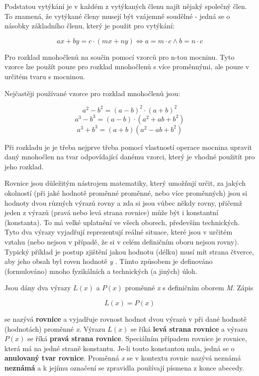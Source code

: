 Podstatou vytýkání je v každém z vytýkaných členu najít nějaký společný člen. To znamená, že vytýkané členy musejí být vzájemně soudělné - jedná se o násobky základního členu, který je použit pro vytýkání:

$$ ax + by = c\cdot (mx + ny) \Leftrightarrow a = m\cdot c \wedge b = n\cdot c $$


Pro rozklad mnohočlenů na součin pomocí vzorců pro n-tou mocninu. Tyto vzorce lze použít pouze pro rozklad mnohočlenů s více proměnnými, ale pouze v určitém tvaru s mocninou.

Nejčastěji používané vzorce pro rozklad mnohočlenů jsou:

$$ a^2 -b^2 = (a-b)^2 \cdot (a+b)^2 $$
$$ a^3 - b^3 = (a-b) \cdot (a^2 + ab +b^2) $$
$$ a^3 + b^3 =(a+b)(a^2-ab+b^2) $$


Při rozkladu je je třeba nejprve třeba pomocí vlastností operace mocnina upravit daný mnohočlen na tvar odpovídající danému vzorci, který je vhodné použitít pro jeho rozklad.




Rovnice jsou důležitým nástrojem matematiky, který umožňují určit, za jakých okolností (při jaké hodnotě proměnné proměnné, nebo více proměnných) jsou si hodnoty dvou různých výrazů rovny a zda si jsou vůbec někdy rovny, přičemž jeden z výrazů (pravá nebo levá strana rovnice) může být i konstantní (konstanta). To má velké uplatnění ve všech oborech, především technických. Tyto dva výrazy vyjadřují reprezentují reálné situace, které jsou v určitém vztahu (nebo nejsou v případě, že si v celém definičním oboru nejsou rovny). Typický příklad je postup zjištění jakou hodnotu (délku) musí mít strana čtverce, aby jeho obsah byl roven hodnotě {\it y} . Tímto způsobem je definováno (formulováno) mnoho fyzikálních a technických (a jiných) úloh. 

Jsou dány dva výrazy $L(x)$ a $P(x)$ proměnné {\it x} s definičním oborem {\it M}. Zápis 

$$ L(x) = P(x) $$

se nazývá {\bf rovnice} a vyjadřuje rovnost hodnot dvou výrazů v při dané hodnotě (hodnotách) proměnné {\it x}. Výrazu $L(x)$ se říká {\bf levá strana rovnice} a výrazu $P(x)$ se říká {\bf pravá strana rovnice}. Speciálním případem rovnice je rovnice, která má na jedné straně konstantu. Je-li touto konstantou nula, jedná se o {\bf anulovaný tvar rovnice}. Proměnná {\it x} se v kontextu rovnic nazývá neznámá {\bf neznámá} a k jejímu označení se zpravidla používají písmena z konce abecedy.

